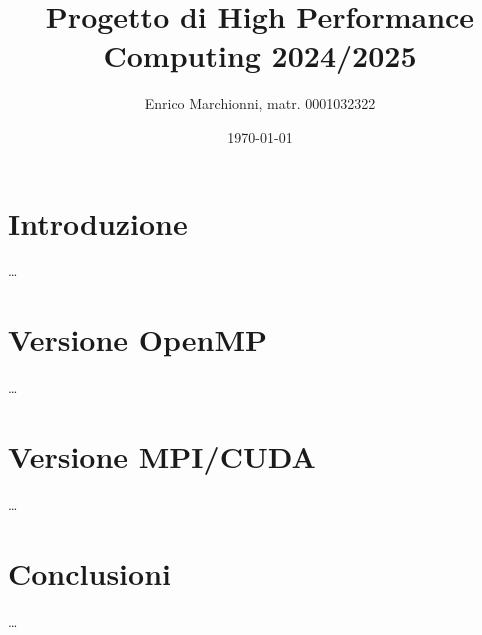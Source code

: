\documentclass[12pt, a4paper]{article}
\title{
  Progetto di High Performance Computing 2024/2025
}
\author{
  Enrico Marchionni, matr. 0001032322
}
\date{\today}
\begin{document}
\maketitle

\section{Introduzione}

\dots

\section{Versione OpenMP}

\dots

\section{Versione MPI/CUDA}

\dots

\section{Conclusioni}

\dots
\end{document}
